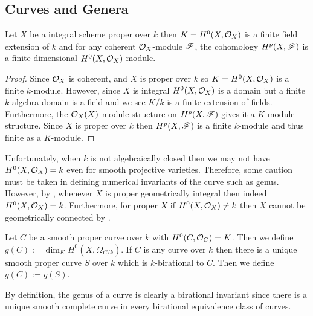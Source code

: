 \documentclass[12pt]{article}
\begin{document}
\subsection{Curves and Genera}

\begin{lemma}
Let $X$ be a integral scheme proper over $k$ then $K = H^0(X, \mathcal{O}_{X})$ is a finite field extension of $k$ and for any coherent $\mathcal{O}_{X}$-module $\mathscr{F}$, the cohomology $H^p(X, \mathscr{F})$ is a finite-dimensional $H^0(X, \mathcal{O}_{X})$-module.
\end{lemma}

\begin{proof}
Since $\mathcal{O}_{X}$ is coherent, and $X$ is proper over $k$ so $K = H^0(X, \mathcal{O}_{X})$ is a finite $k$-module. However, since $X$ is integral $H^0(X, \mathcal{O}_{X})$ is a domain but a finite $k$-algebra domain is a field and we see $K / k$ is a finite extension of fields. Furthermore, the $\mathcal{O}_{X}(X)$-module structure on $H^p(X, \mathscr{F})$ gives it a $K$-module structure. Since $X$ is proper over $k$ then $H^p(X, \mathscr{F})$ is a finite $k$-module and thus finite as a $K$-module.
\end{proof}

\begin{rmk}
Unfortunately, when $k$ is not algebraically closed then we may not have $H^0(X, \mathcal{O}_{X}) = k$ even for smooth projective varieties. Therefore, some caution must be taken in defining numerical invariants of the curve such as genus. However, by \cite[\href{https://stacks.math.columbia.edu/tag/0BUG}{Tag 0BUG}]{stacks-project}, whenever $X$ is proper geometrically integral then indeed $H^0(X, \mathcal{O}_{X}) = k$. Furthermore, for proper $X$ if $H^0(X, \mathcal{O}_{X}) \neq k$ then $X$ cannot be geometrically connected by \cite[\href{https://stacks.math.columbia.edu/tag/0FD1}{Tag 0FD1}]{stacks-project}.
\end{rmk}

\begin{defn}
Let $C$ be a smooth proper curve over $k$ with $H^0(C, \mathcal{O}_{C}) = K$. Then we define $g(C) := \dim_K H^0(X, \Omega_{C / k})$. If $C$ is any curve over $k$ then there is a unique smooth proper curve $S$ over $k$ which is $k$-birational to $C$. Then we define $g(C) := g(S)$. 
\end{defn}

\begin{rmk}
By definition, the genus of a curve is clearly a birational invariant since there is a unique smooth complete curve in every birational equivalence class of curves. 
\end{rmk}
\end{document}
